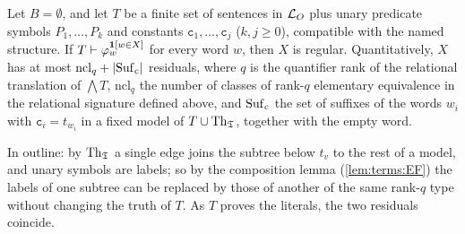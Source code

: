 \begin{theorem}\label{thm:terms:regular}
Let $B=\emptyset$, and let $T$ be a finite set of sentences in $\mathcal{L}_{O}$ plus unary predicate symbols $P_1,\dots,P_k$ and constants $\mathtt c_1,\dots,\mathtt c_j$ ($k,j\ge0$), compatible with the named structure. If $T\vdash\varphi_w^{\mathbf{1}[w\in X]}$ for every word $w$, then $X$ is regular. Quantitatively, $X$ has at most $\mathrm{ncl}_q+\lvert\mathrm{Suf}_{\rm c}\rvert$ residuals, where $q$ is the quantifier rank of the relational translation of $\bigwedge T$, $\mathrm{ncl}_q$ the number of classes of rank-$q$ elementary equivalence in the relational signature defined above, and $\mathrm{Suf}_{\rm c}$ the set of suffixes of the words $w_i$ with $\mathtt c_i=t_{w_i}$ in a fixed model of $T\cup\mathrm{Th}_{\mathfrak{T}}$, together with the empty word.
\end{theorem}

In outline: by $\mathrm{Th}_{\mathfrak{T}}$ a single edge joins the subtree below $t_v$ to the rest of a model, and unary symbols are labels; so by the composition lemma (\cref{lem:terms:EF}) the labels of one subtree can be replaced by those of another of the same rank-$q$ type without changing the truth of $T$. As $T$ proves the literals, the two residuals coincide.

